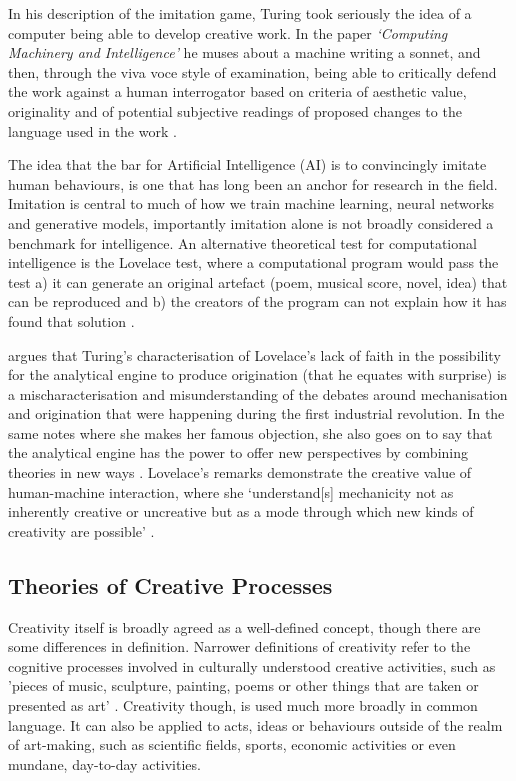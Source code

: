 In his description of the imitation game, Turing took seriously the idea of a computer being able to develop creative work. 
In the paper \textit{`Computing Machinery and Intelligence'} he muses about a machine writing a sonnet, and then, through the viva voce style of examination, being able to critically defend the work against a human interrogator based on criteria of aesthetic value, originality and of potential subjective readings of proposed changes to the language used in the work \citep{machinery1950computing}.

The idea that the bar for Artificial Intelligence (AI) is to convincingly imitate human behaviours, is one that has long been an anchor for research in the field. 
Imitation is central to much of how we train machine learning, neural networks and generative models, importantly imitation alone is not broadly considered a benchmark for intelligence.
An alternative theoretical test for computational intelligence is the Lovelace test, where a computational program would pass the test a) it can generate an original artefact (poem, musical score, novel, idea) that can be reproduced and b) the creators of the program can not explain how it has found that solution \citep{bringsjord2003creativity}. 

\cite{ward2020computational} argues that Turing's characterisation of Lovelace's lack of faith in the possibility for the analytical engine to produce origination (that he equates with surprise) is a mischaracterisation and misunderstanding of the debates around mechanisation and origination that were happening during the first industrial revolution. 
In the same notes where she makes her famous objection, she also goes on to say that the analytical engine has the power to offer new perspectives by combining theories in new ways \citep{lovelace1843notes}.
 Lovelace's remarks demonstrate the creative value of human-machine interaction, where she `understand[s] mechanicity not as inherently creative or uncreative but as a mode through which new kinds of creativity are possible' \citep{ward2020computational}.

\subsection{Theories of Creative Processes}

Creativity itself is broadly agreed as a well-defined concept, though there are some differences in definition. 
Narrower definitions of creativity refer to the cognitive processes involved in culturally understood creative activities, such as 'pieces of music, sculpture, painting, poems or other things that are taken or presented as art' \citep{wiggins2015evolutionary}.
Creativity though, is used much more broadly in common language. 
It can also be applied to acts, ideas or behaviours outside of the realm of art-making, such as scientific fields, sports, economic activities or even mundane, day-to-day activities.


